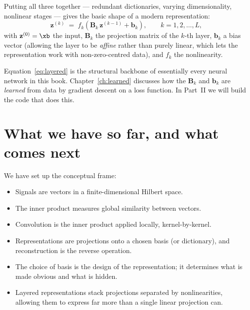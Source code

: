 Putting all three together --- redundant dictionaries, varying
dimensionality, nonlinear stages --- gives the basic shape of a modern
representation:
\begin{equation}
    \mathbf{z}^{(k)} \;=\; f_k\!\left(\mathbf{B}_k\, \mathbf{z}^{(k-1)} + \mathbf{b}_k\right),
    \qquad k = 1, 2, \ldots, L,
    \label{eq:layered}
\end{equation}
with $\mathbf{z}^{(0)} = \xb$ the input, $\mathbf{B}_k$ the projection
matrix of the $k$-th layer, $\mathbf{b}_k$ a bias vector (allowing the
layer to be \emph{affine} rather than purely linear, which lets the
representation work with non-zero-centred data), and $f_k$ the
nonlinearity.


Equation~\eqref{eq:layered} is the structural backbone of essentially
every neural network in this book.  Chapter~\ref{ch:learned} discusses
how the $\mathbf{B}_k$ and $\mathbf{b}_k$ are \emph{learned} from data
by gradient descent on a loss function.  In Part~\textsc{II} we will
build the code that does this.

\section{What we have so far, and what comes next}

We have set up the conceptual frame:

\begin{itemize}
    \item Signals are vectors in a finite-dimensional Hilbert space.
    \item The inner product measures global similarity between vectors.
    \item Convolution is the inner product applied locally, kernel-by-kernel.
    \item Representations are projections onto a chosen basis (or
    dictionary), and reconstruction is the reverse operation.
    \item The choice of basis is the design of the representation; it
    determines what is made obvious and what is hidden.
    \item Layered representations stack projections separated by
    nonlinearities, allowing them to express far more than a single linear
    projection can.
\end{itemize}

